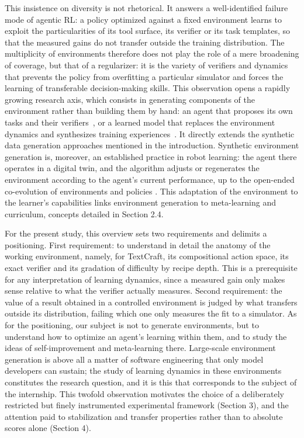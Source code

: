 \documentclass[11pt,a4paper]{article}
\begin{document}
This insistence on diversity is not rhetorical. It answers a well-identified failure mode of agentic RL: a policy optimized against a fixed environment learns to exploit the particularities of its tool surface, its verifier or its task templates, so that the measured gains do not transfer outside the training distribution. The multiplicity of environments therefore does not play the role of a mere broadening of coverage, but that of a regularizer: it is the variety of verifiers and dynamics that prevents the policy from overfitting a particular simulator and forces the learning of transferable decision-making skills. This observation opens a rapidly growing research axis, which consists in generating components of the environment rather than building them by hand: an agent that proposes its own tasks and their verifiers~\cite{zhou2025sca}, or a learned model that replaces the environment dynamics and synthesizes training experiences~\cite{dreamgym2025}. It directly extends the synthetic data generation approaches mentioned in the introduction. Synthetic environment generation is, moreover, an established practice in robot learning: the agent there operates in a digital twin, and the algorithm adjusts or regenerates the environment according to the agent's current performance, up to the open-ended co-evolution of environments and policies \cite{wang2019poet}. This adaptation of the environment to the learner's capabilities links environment generation to meta-learning and curriculum, concepts detailed in Section 2.4.

For the present study, this overview sets two requirements and delimits a positioning. First requirement: to understand in detail the anatomy of the working environment, namely, for TextCraft, its compositional action space, its exact verifier and its gradation of difficulty by recipe depth. This is a prerequisite for any interpretation of learning dynamics, since a measured gain only makes sense relative to what the verifier actually measures. Second requirement: the value of a result obtained in a controlled environment is judged by what transfers outside its distribution, failing which one only measures the fit to a simulator. As for the positioning, our subject is not to generate environments, but to understand how to optimize an agent's learning within them, and to study the ideas of self-improvement and meta-learning there. Large-scale environment generation is above all a matter of software engineering that only model developers can sustain; the study of learning dynamics in these environments constitutes the research question, and it is this that corresponds to the subject of the internship. This twofold observation motivates the choice of a deliberately restricted but finely instrumented experimental framework (Section 3), and the attention paid to stabilization and transfer properties rather than to absolute scores alone (Section 4).
\end{document}
